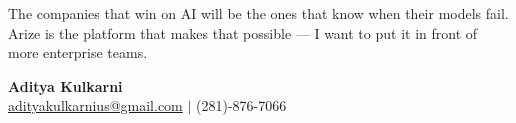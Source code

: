 \documentclass[11pt,letterpaper]{article}
\begin{document}
\vspace{8pt}

The companies that win on AI will be the ones that know when their models fail. Arize is the platform that makes that possible --- I want to put it in front of more enterprise teams.

\vspace{12pt}

{\color{ArizeViolet} \textbf{Aditya Kulkarni}} \\
\href{mailto:adityakulkarnius@gmail.com}{adityakulkarnius@gmail.com} \quad $|$ \quad (281)-876-7066
\end{document}
